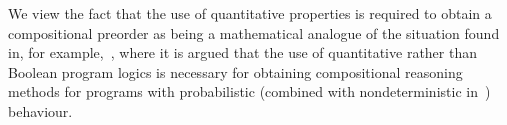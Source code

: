 We view the fact that the use of quantitative properties is required to obtain a compositional preorder as being
a mathematical analogue of the situation found in, for example,~\cite{KozenPDL,MciverMorgan}, where it is argued that the use of quantitative rather than Boolean program logics is necessary for obtaining compositional reasoning methods for programs with probabilistic (combined with nondeterministic in~\cite{MciverMorgan}) behaviour.




